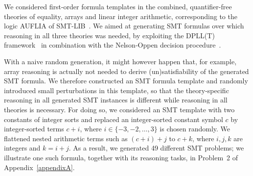 We considered first-order formula templates in the combined,
quantifier-free 
theories of equality, arrays and linear integer arithmetic,
corresponding to the logic AUFLIA of
SMT-LIB~\cite{barrett2017smtlib}. We aimed at generating SMT formulas
over which reasoning in all three theories was needed, by exploiting
the DPLL(T) framework~\cite{Tinelli02} in combination with the
Nelson-Oppen decision procedure~\cite{Nelson79}.
%

With a  naive random generation,  it might however happen
that, for example, array reasoning is actually not needed to derive
(un)satisfi\-ability of the generated SMT formula. We therefore constructed an
SMT formula template and 
%
%
randomly introduced small perturbations in this template,  so that the
theory-specific reasoning in all generated SMT instances is
different while reasoning in all theories is necessary.
For doing so, we considered an SMT template with two constants of
integer sorts and replaced an integer-sorted constant symbol $c$ by  integer-sorted terms $c+i$,
where $i \in \{-3,-2,\dots,3\}$ is chosen randomly. We flattened nested arithmetic terms such as $(c+i)+j$ to $c+k$,
where $i,j,k$ are integers and $k = i+j$. As a result, we
generated 49 different SMT problems; we illustrate one such formula, together
with its reasoning tasks, in Problem~2 of Appendix~\ref{appendixA}.

